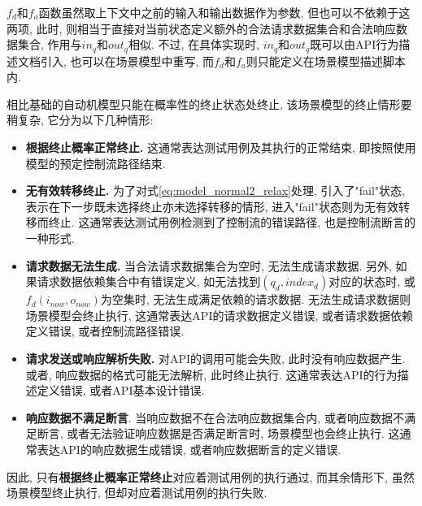         $f_d$和$f_a$函数虽然取上下文中之前的输入和输出数据作为参数, 但也可以不依赖于这两项, 此时, 则相当于直接对当前状态定义额外的合法请求数据集合和合法响应数据集合, 作用与$in_q$和$out_q$相似. 不过, 在具体实现时, $in_q$和$out_q$既可以由API行为描述文档引入, 也可以在场景模型中重写, 而$f_d$和$f_a$则只能定义在场景模型描述脚本内.
        
        相比基础的自动机模型只能在概率性的终止状态处终止, 该场景模型的终止情形要稍复杂, 它分为以下几种情形:
        \begin{itemize}
            \item \textbf{根据终止概率正常终止.} 这通常表达测试用例及其执行的正常结束, 即按照使用模型的预定控制流路径结束.
            
            \item \textbf{无有效转移终止.} 为了对式\ref{eq:model_normal2_relax}处理, 引入了"fail"状态, 表示在下一步既未选择终止亦未选择转移的情形, 进入"fail"状态则为无有效转移而终止. 这通常表达测试用例检测到了控制流的错误路径, 也是控制流断言的一种形式.
            
            \item \textbf{请求数据无法生成.} 当合法请求数据集合为空时, 无法生成请求数据. 另外, 如果请求数据依赖集合中有错误定义, 如无法找到$(q_d, index_d)$对应的状态时, 或$f_d(i_{now}, o_{now})$为空集时, 无法生成满足依赖的请求数据. 无法生成请求数据则场景模型会终止执行, 这通常表达API的请求数据定义错误, 或者请求数据依赖定义错误, 或者控制流路径错误.
            
            \item \textbf{请求发送或响应解析失败.} 对API的调用可能会失败, 此时没有响应数据产生. 或者, 响应数据的格式可能无法解析, 此时终止执行. 这通常表达API的行为描述定义错误, 或者API基本设计错误. 
            
            \item \textbf{响应数据不满足断言}. 当响应数据不在合法响应数据集合内, 或者响应数据不满足断言, 或者无法验证响应数据是否满足断言时, 场景模型也会终止执行. 这通常表达API的响应数据生成错误, 或者响应数据断言的定义错误.
        \end{itemize}
        因此, 只有\textbf{根据终止概率正常终止}对应着测试用例的执行通过, 而其余情形下, 虽然场景模型终止执行, 但却对应着测试用例的执行失败.
        
